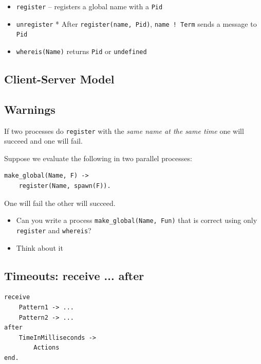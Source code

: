 \documentclass[12pt]{article}
\begin{document}
\begin{itemize}
\begin{itemize}
\item \verb+register+ -- registers a global name with a \verb+Pid+
\item \verb+unregister+
* After \verb+register(name, Pid)+, \verb+name ! Term+ sends a message to \verb+Pid+
\item \verb+whereis(Name)+ returns \verb+Pid+ or \verb+undefined+
\end{itemize}

\subsection{Client-Server Model}



\subsection{Warnings}

If two processes do \verb+register+ with the {\sl same name at the
  same time} one will succeed and one will fail.

Suppose we evaluate the following in two parallel processes:

\begin{verbatim}
make_global(Name, F) ->
    register(Name, spawn(F)).
\end{verbatim}

One will fail the other will succeed. 

\begin{itemize}
\item Can you write a process \verb+make_global(Name, Fun)+ that is
  correct using only \verb+register+ and \verb+whereis+?

\item Think about it
\end{itemize}

\subsection{Timeouts:  receive ... after}

\begin{verbatim}
receive
    Pattern1 -> ...
    Pattern2 -> ...
after
    TimeInMilliseconds ->
        Actions
end.
\end{verbatim}


\end{itemize}
\end{document}
